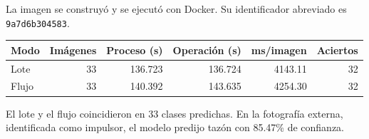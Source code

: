 La imagen se construyó y se ejecutó con Docker. Su identificador abreviado es \texttt{9a7d6b304583}.
\begin{center}\small
\begin{tabular}{lrrrrr}\toprule
Modo & Imágenes & Proceso (s) & Operación (s) & ms/imagen & Aciertos \\\midrule
Lote & 33 & 136.723 & 136.724 & 4143.11 & 32 \\
Flujo & 33 & 140.392 & 143.635 & 4254.30 & 32 \\
\bottomrule\end{tabular}\end{center}
El lote y el flujo coincidieron en 33 clases predichas.
En la fotografía externa, identificada como impulsor, el modelo predijo tazón con 85.47\% de confianza.
